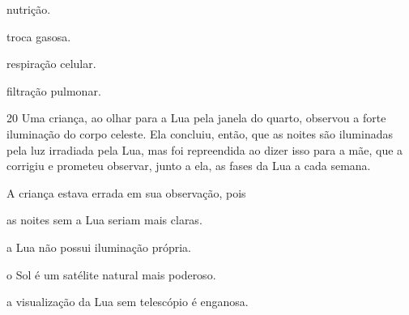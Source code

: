 \begin{minipage}{.5\textwidth}
\begin{escolha}
\item nutrição.

\item troca gasosa.

\item respiração celular.

\item filtração pulmonar.
\end{escolha}
\end{minipage}

\num{20} Uma criança, ao olhar para a Lua pela janela do quarto,
observou a forte iluminação do corpo celeste. Ela concluiu, então, que
as noites são iluminadas pela luz irradiada pela Lua, mas foi
repreendida ao dizer isso para a mãe, que a corrigiu e prometeu
observar, junto a ela, as fases da Lua a cada semana.

A criança estava errada em sua observação, pois

\begin{escolha}
\item as noites sem a Lua seriam mais claras.

\item a Lua não possui iluminação própria.

\item o Sol é um satélite natural mais poderoso.

\item a visualização da Lua sem telescópio é enganosa.
\end{escolha}

